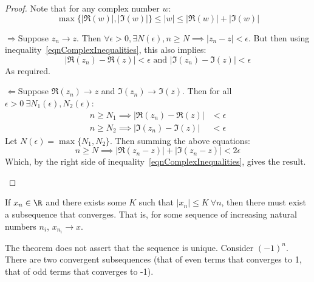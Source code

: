 \documentclass[../Main.tex]{subfiles}
\begin{document}
\begin{proof}
    Note that for any complex number $w$:
    \begin{equation}
        \max{\{|\Re(w)|, |\Im(w)|\}} \leq |w| \leq |\Re(w)| + |\Im(w)|
        \label{eqnComplexInequalities}
    \end{equation}
    \begin{proofdirection}{$\Rightarrow$}{Suppose $z_n \rightarrow z$.}
        Then $\forall \epsilon > 0, \exists N(\epsilon), n \geq N \implies |z_n - z| < \epsilon$. But then using inequality~\ref{eqnComplexInequalities}, this also implies:
        \begin{equation*}
            |\Re(z_n) - \Re(z)| < \epsilon \text{ and } |\Im(z_n) - \Im(z)| < \epsilon
        \end{equation*}
        As required.
    \end{proofdirection}
    \begin{proofdirection}{$\Leftarrow$}{Suppose $\Re(z_n) \rightarrow z$ and $\Im(z_n) \rightarrow \Im(z)$.}
        Then for all $\epsilon > 0~\exists N_1(\epsilon), N_2(\epsilon)$:
        \begin{align*}
            n \geq N_1 \implies |\Re(z_n) - \Re(z)| &< \epsilon \\
            n \geq N_2 \implies |\Im(z_n) - \Im(z)| &< \epsilon
        \end{align*}
        Let $N(\epsilon) = \max{\{N_1, N_2\}}$. Then summing the above equations:
        \begin{equation*}
            n \geq N \implies |\Re(z_n - z)| + |\Im(z_n - z)| < 2\epsilon
        \end{equation*}
        Which, by the right side of inequality~\ref{eqnComplexInequalities}, gives the result.
    \end{proofdirection}
\end{proof}
\begin{theorem}
    If $x_n \in \R$ and there exists some $K$ such that $|x_n| \leq K~\forall n$, then there must exist a subsequence that converges. That is, for some sequence of increasing natural numbers $n_i$, $x_{n_i} \rightarrow x$.
\end{theorem}
\begin{remark}
    The theorem does not assert that the sequence is unique. Consider $(-1)^n$. There are two convergent subsequences (that of even terms that converges to 1, that of odd terms that converges to -1).
\end{remark}
\end{document}
